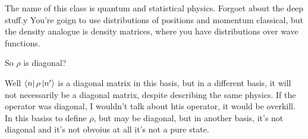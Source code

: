 The name of this class is quantum and statistical physics.
Forgoet about the deep stuff.y
You're goign to use distributions of positions and momentum classical,
but the density analogue is density matrices,
where you have distributions over wave functions.


\begin{question}
    So $\rho$ is diagonal?
\end{question}
Well $\bra{n}\rho\ket{n'}$ is a diagonal matrix in this basis,
but in a different basis,
it will not necessarily be a diagonal matrix,
despite describing the same physics.
If the operator was diagonal,
I wouldn't talk about htis operator,
it would be overkill.
In this basiss to define $\rho$,
but may be diagonal,
but in another basis,
it's not diagonal
and it's not obvoius at all it's not a pure state.
